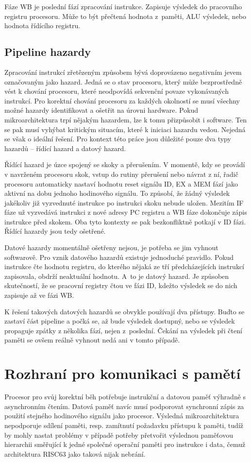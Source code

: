 \documentclass[
  digital, %
  color,   %
  table,   %
  twoside, %
  nolof,   %
  nolot,   %
]{fithesis3}
\begin{document}
Fáze WB je poslední fází zpracování instrukce. Zapisuje výsledek do pracovního registru procesoru. Může to být přečtená hodnota z~paměti, ALU výsledek, nebo hodnota řídícího registru.

\subsection{Pipeline hazardy}
\label{subsec:hazard}
Zpracování instrukcí zřetězeným způsobem bývá doprovázeno negativním jevem označovaným jako hazard. Jedná se o stav procesoru, který může bezprostředně vést k chování procesoru, které neodpovídá sekvenční povaze vykonávaných instrukcí. Pro korektní chování procesoru za každých okolností se musí všechny možné hazardy identifikovat a ošetřit na úrovni hardware. Pokud mikroarchitektura trpí nějakým hazardem, lze k tomu přizpůsobit i software. Ten se pak musí vyhýbat kritickým situacím, které k iniciaci hazardu vedou. Nejedná se však o ideální řešení. Pro kontext této práce jsou důležité pouze dva typy hazardů -- řídící hazard a datový hazard.

Řídící hazard je úzce spojený se skoky a přerušením. V momentě, kdy se provádí v navrženém procesoru skok, vstup do rutiny přerušení nebo návrat z ní, řadič procesoru automaticky nastaví hodnotu reset signálu ID, EX a MEM fází jako aktivní na dobu jednoho hodinového signálu. To způsobí, že žádný výsledek jakékoliv již vyzvednuté instrukce po instrukci skoku nebude uložen. Mezitím IF fáze už vyzvedává instrukci z nové adresy PC registru a WB fáze dokončuje zápis instrukce před skokem. Oba tyto kontexty se pak bezkonfliktně potkají v ID fázi. Řídící hazardy jsou tedy ošetřené.

Datové hazardy momentálně ošetřeny nejsou, je potřeba se jim vyhnout softwarově. Pro vznik datového hazardů existuje jednoduché pravidlo. Pokud instrukce čte hodnotu registru, do kterého nějaká ze tří předcházejících instrukcí zapisovala, obdrží neaktuální hodnotu. A~to je datový hazard. Je způsoben skutečností, že se pracovní registry čtou ve fázi ID, kdežto výsledek se do nich zapisuje až ve fázi WB.

K řešení takových datových hazardů se obvykle používají dva přístupy. Buďto se zastaví část pipeline a počká se, až bude výsledek dostupný, nebo se výsledek propaguje zpátky z několika fází, nejen z~poslední. Čekání na výsledek při čtení paměti se ovšem reálně vyhnout nedá ani v tomto případě.

\section{Rozhraní pro komunikaci s pamětí}
\label{subsec:interface}
Procesor pro svůj korektní běh potřebuje instrukční a datovou paměť výhradně s asynchronním čtením. Datová paměť navíc musí podporovat synchronní zápis za použití stejného hodinového signálu jako procesor. Výsledná mikroarchitektura nepodporuje sdílení paměti, resp. zamítnutí požadavku přístupu k paměti, tudíž by mohly nastat problémy v případě potřeby přetvořit výslednou paměťovou hierarchii směřující k jedné společné operační paměti pro instrukce i data, čemuž architektura RISC63 jako taková nijak nebrání.
\end{document}
